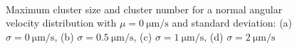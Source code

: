 \documentclass[../../master_thesis_np.tex]{subfiles}
\begin{document}
		\begin{figure}
		\centering
		\ContinuedFloat
			\\
			
			\caption{Maximum cluster size and cluster number for a normal angular velocity distribution with $\mu = \SI{0}{\um\per\second}$ and standard deviation: (a) $\sigma = \SI{0}{\um\per\second}$, (b) $\sigma = \SI{0.5}{\um\per\second}$, (c) $\sigma = \SI{1}{\um\per\second}$, (d) $\sigma = \SI{2}{\um\per\second}$}
			\label{fig:lj_av_clust}
		\end{figure}
		
\end{document}
